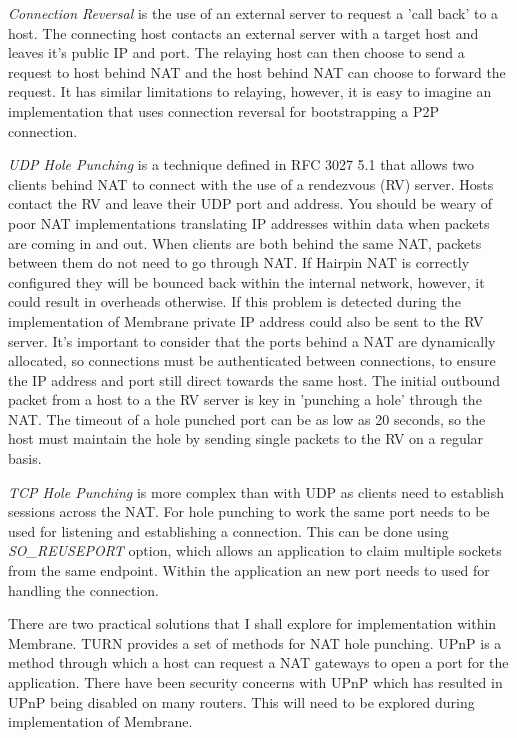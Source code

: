 \documentclass[a4paper, 11pt, twocolumn, twoside]{report}
\begin{document}
\emph{Connection Reversal} is the use of an external server to request a 'call back' to a host. The connecting host contacts an external server with a target host and leaves it's public IP and port. The relaying host can then choose to send a request to host behind NAT and the host behind NAT can choose to forward the request. It has similar limitations to relaying, however, it is easy to imagine an implementation that uses connection reversal for bootstrapping a P2P connection.

\emph{UDP Hole Punching} is a technique defined in RFC 3027 5.1 \citep{holdrege2001rfc} that allows two clients behind NAT to connect with the use of a rendezvous (RV) server. Hosts contact the RV and leave their UDP port and address. You should be weary of poor NAT implementations translating IP addresses within data when packets are coming in and out. \citep{ford2005peer} When clients are both behind the same NAT, packets between them do not need to go through NAT. If Hairpin NAT is correctly configured they will be bounced back within the internal network, however, it could result in overheads otherwise. If this problem is detected during the implementation of Membrane private IP address could also be sent to the RV server. It's important to consider that the ports behind a NAT are dynamically allocated, so connections must be authenticated between connections, to ensure the IP address and port still direct towards the same host. The initial outbound packet from a host to a the RV server is key in 'punching a hole' through the NAT. The timeout of a hole punched port can be as low as 20 seconds, so the host must maintain the hole by sending single packets to the RV on a regular basis.

\emph{TCP Hole Punching} is more complex than with UDP as clients need to establish sessions across the NAT. For hole punching to work the same port needs to be used for listening and establishing a connection. This can be done using \emph{SO\_REUSEPORT} option, which allows an application to claim multiple sockets from the same endpoint. Within the application an new port needs to used for handling the connection.

There are two practical solutions that I shall explore for implementation within Membrane. TURN \citep{wing2010traversal} provides a set of methods for NAT hole punching. UPnP \citep{boucadair2013universal} is a method through which a host can request a NAT gateways to open a port for the application. There have been security concerns with UPnP which has resulted in UPnP being disabled on many routers. This will need to be explored during implementation of Membrane.
\end{document}
